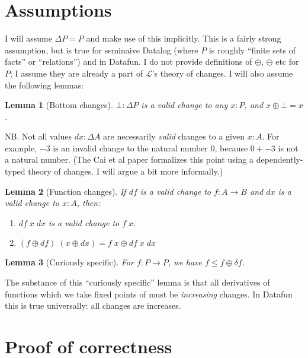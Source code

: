 \documentclass{article}
\newcommand{\mc}[1]{\ensuremath{\mathcal{#1}}}
\newtheorem{lemma}{Lemma}
\theoremstyle{definition}
\newcommand{\dv}{\delta}
\begin{document}

\section{Assumptions}

I will assume $\Delta P = P$ and make use of this implicitly. This is a fairly
strong assumption, but is true for seminaive Datalog (where $P$ is roughly
``finite sets of facts'' or ``relations'') and in Datafun. I do not provide
definitions of $\oplus$, $\ominus$ etc for $P$; I assume they are already a part
of $\mc{L}$'s theory of changes. I will also assume the following lemmas:

\begin{lemma}[Bottom changes]
  \label{lem:bot-change}
  $\bot : \Delta P$ is a valid change to any $x : P$, and $x \oplus \bot = x$.
\end{lemma}

NB. Not all values $dx : \Delta{A}$ are necessarily \emph{valid} changes to a
given $x : A$. For example, $-3$ is an invalid change to the natural number $0$,
because $0 + -3$ is not a natural number. (The Cai et al paper formalizes this
point using a dependently-typed theory of changes. I will argue a bit more
informally.)

\begin{lemma}[Function changes]
  \label{lem:fun-change}
  If $df$ is a valid change to $f : A \to B$ and $dx$ is a valid change to $x :
  A$, then:
  \begin{enumerate}
  \item $df\; x\; dx$ is a valid change to $f\;x$.
  \item \( (f \oplus df)\;(x \oplus dx) = f\;x \oplus df\;x\;dx \)
  \end{enumerate}
\end{lemma}

\begin{lemma}[Curiously specific]  \label{lem:curiously-specific}
  For $f : P \to P$, we have $f \le f \oplus \dv f$.
\end{lemma}

The substance of this ``curiously specific'' lemma is that all derivatives of
functions which we take fixed points of must be \emph{increasing} changes. In
Datafun this is true universally: all changes are increases.


\section{Proof of correctness}
\end{document}
